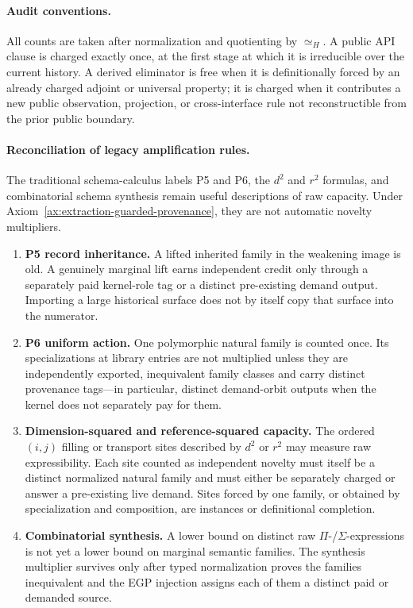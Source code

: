 \paragraph{Audit conventions.}
All counts are taken after normalization and quotienting by
\(\simeq_H\). A public API clause is charged exactly once, at the first stage at
which it is irreducible over the current history. A derived eliminator is free
when it is definitionally forced by an already charged adjoint or universal
property; it is charged when it contributes a new public observation,
projection, or cross-interface rule not reconstructible from the prior public
boundary.

\paragraph{Reconciliation of legacy amplification rules.}
The traditional schema-calculus labels P5 and P6, the \(d^2\) and \(r^2\)
formulas, and combinatorial schema synthesis remain useful descriptions of raw
capacity. Under Axiom~\ref{ax:extraction-guarded-provenance}, they are not
automatic novelty multipliers.

\begin{enumerate}[leftmargin=*, label=\textbf{R\arabic*.}]
\item \textbf{P5 record inheritance.} A lifted inherited family in the
weakening image is old. A genuinely marginal lift earns independent credit
only through a separately paid kernel-role tag or a distinct pre-existing
demand output. Importing a large historical surface does not by itself copy
that surface into the numerator.

\item \textbf{P6 uniform action.} One polymorphic natural family is counted
once. Its specializations at library entries are not multiplied unless they
are independently exported, inequivalent family classes and carry distinct
provenance tags---in particular, distinct demand-orbit outputs when the kernel
does not separately pay for them.

\item \textbf{Dimension-squared and reference-squared capacity.} The ordered
\((i,j)\) filling or transport sites described by \(d^2\) or \(r^2\) may measure
raw expressibility. Each site counted as independent novelty must itself be a
distinct normalized natural family and must either be separately charged or
answer a pre-existing live demand. Sites forced by one family, or obtained by
specialization and composition, are instances or definitional completion.

\item \textbf{Combinatorial synthesis.} A lower bound on distinct raw
\(\Pi\)-/\(\Sigma\)-expressions is not yet a lower bound on marginal semantic
families. The synthesis multiplier survives only after typed normalization
proves the families inequivalent and the EGP injection assigns each of them a
distinct paid or demanded source.
\end{enumerate}

